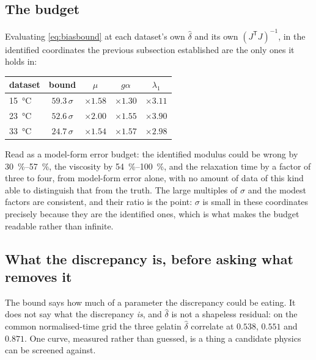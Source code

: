 \documentclass[10pt]{article}
\begin{document}
\subsection*{The budget}

Evaluating \eqref{eq:biasbound} at each dataset's own $\hat\delta$ and its own
$(J^{\mathsf T}J)^{-1}$, in the identified coordinates the previous subsection established are
the only ones it holds in:

\begin{center}
\begin{tabular}{lcccc}
\toprule
dataset & bound & $\mu$ & $g\alpha$ & $\lambda_1$ \\
\midrule
\SI{15}{\celsius} & $59.3\,\sigma$ & $\times 1.58$ & $\times 1.30$ & $\times 3.11$ \\
\SI{23}{\celsius} & $52.6\,\sigma$ & $\times 2.00$ & $\times 1.55$ & $\times 3.90$ \\
\SI{33}{\celsius} & $24.7\,\sigma$ & $\times 1.54$ & $\times 1.57$ & $\times 2.98$ \\
\bottomrule
\end{tabular}
\end{center}

\noindent Read as a model-form error budget: the identified modulus could be wrong by
\SIrange{30}{57}{\percent}, the viscosity by \SIrange{54}{100}{\percent}, and the relaxation
time by a factor of three to four, from model-form error alone, with no amount of data of this
kind able to distinguish that from the truth. The large multiples of $\sigma$ and the modest
factors are consistent, and their ratio is the point: $\sigma$ is small in these coordinates
precisely because they are the identified ones, which is what makes the budget readable rather
than infinite.

\subsection*{What the discrepancy is, before asking what removes it}

The bound says how much of a parameter the discrepancy could be eating. It does not say what
the discrepancy \emph{is}, and $\hat\delta$ is not a shapeless residual: on the common
normalised-time grid the three gelatin $\hat\delta$ correlate at $0.538$, $0.551$ and $0.871$.
One curve, measured rather than guessed, is a thing a candidate physics can be screened against.
\end{document}
